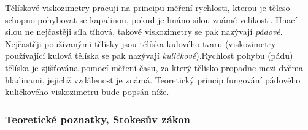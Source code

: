 \documentclass[12pt]{article}
\begin{document}
Tělískové viskozimetry pracují na principu měření rychlosti, kterou je těleso schopno pohybovat se kapalinou, pokud je hnáno silou známé velikosti. Hnací silou ne nejčastěji síla tíhová, takové viskozimetry se pak nazývají \emph{pádové}. Nejčastěji používanými tělísky jsou tělíska kulového tvaru (viskozimetry používající kulová tělíska se pak nazývají \emph{kuličkové}).\footnotemark Rychlost pohybu (pádu) tělíska je zjišťována pomocí měření času, za který tělísko propadne mezi dvěma hladinami, jejichž vzdálenost je známá. Teoretický princip fungování pádového kuličkového viskozimetru bude popsán níže.

\subsubsection{Teoretické poznatky, Stokesův zákon}%
\end{document}

